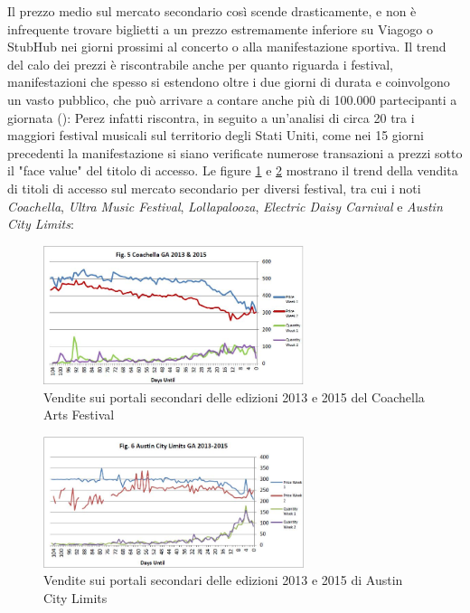 Il prezzo medio sul mercato secondario così scende drasticamente, e non è infrequente trovare biglietti a un prezzo estremamente inferiore su Viagogo o StubHub nei giorni prossimi al concerto o alla manifestazione sportiva. Il trend del calo dei prezzi è riscontrabile anche per quanto riguarda i festival, manifestazioni che spesso si estendono oltre i due giorni di durata e coinvolgono un vasto pubblico, che può arrivare a contare anche più di 100.000 partecipanti a giornata (\cite{perez2016music}): Perez infatti riscontra, in seguito a un'analisi di circa 20 tra i maggiori festival musicali sul territorio degli Stati Uniti, come nei 15 giorni precedenti la manifestazione si siano verificate numerose transazioni a prezzi sotto il "face value" del titolo di accesso. Le figure \ref{coach} e \ref{acl} mostrano il trend della vendita di titoli di accesso sul mercato secondario per diversi festival, tra cui i noti \textit{Coachella}, \textit{Ultra Music Festival}, \textit{Lollapalooza}, \textit{Electric Daisy Carnival} e \textit{Austin City Limits}: 
\begin{figure}[htbp]
	\centering
	\includegraphics[width=0.68\textwidth]{chapter4/immagini/coachella1315}
	\caption{Vendite sui portali secondari delle edizioni 2013 e 2015 del Coachella Arts Festival}
	\label{coach}
\end{figure}
\begin{figure}[htbp]
	\centering
	\includegraphics[width=0.68\textwidth]{chapter4/immagini/acl1315}
	\caption{Vendite sui portali secondari delle edizioni 2013 e 2015 di Austin City Limits}
	\label{acl}
\end{figure}
